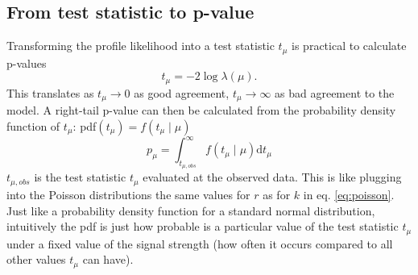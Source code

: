 \subsection{From test statistic to p-value}   
Transforming the profile likelihood into a test statistic $t_{\mu}$ is practical to calculate p-values
\begin{equation}
    t_{\mu}=-2\log \lambda(\mu).
\end{equation}
This translates as $t_{\mu} \rightarrow 0$ as good agreement, $t_{\mu} \rightarrow \infty$ as bad agreement to the model. A right-tail p-value can then be calculated from the probability density function of $t_\mu$: pdf$(t_\mu) = f(t_\mu \mid \mu)$
\begin{equation}\label{eq:p-value}
    p_\mu = \int_{t_{\mu ,obs}}^{\infty} 
    f(t_\mu \mid \mu) \mathrm{d}t_\mu
\end{equation}
$t_{\mu ,obs}$ is the test statistic $t_\mu$ evaluated at the observed data. This is like plugging into the Poisson distributions the same values for $r$ as for $k$ in eq. \ref{eq:poisson}. Just like a probability density function for a standard normal distribution, intuitively the pdf is just how probable is a particular value of the test statistic $t_\mu$ under a fixed value of the signal strength (how often it occurs compared to all other values $t_\mu$ can have). 

